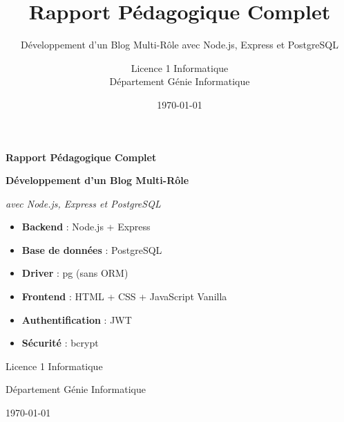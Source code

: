 \documentclass[a4paper,12pt]{book}
\title{\textbf{\Huge Rapport Pédagogique Complet}}
\subtitle{\Large Développement d'un Blog Multi-Rôle avec Node.js, Express et PostgreSQL}
\author{Licence 1 Informatique\\Département Génie Informatique}
\date{\today}
\begin{document}
\begin{titlepage}
    \centering
    \vspace*{2cm}
    {\Huge\bfseries\color{deepblue} Rapport Pédagogique Complet\par}
    \vspace{1cm}
    {\Large\bfseries\color{darkblue} Développement d'un Blog Multi-Rôle\par}
    \vspace{0.5cm}
    {\large\itshape avec Node.js, Express et PostgreSQL\par}
    \vspace{2cm}
    
    \begin{tcolorbox}[colback=white,colframe=deepblue,width=0.8\textwidth,center,title=Stack Technologique]
        \begin{itemize}
            \item \textbf{Backend} : Node.js + Express
            \item \textbf{Base de données} : PostgreSQL
            \item \textbf{Driver} : pg (sans ORM)
            \item \textbf{Frontend} : HTML + CSS + JavaScript Vanilla
            \item \textbf{Authentification} : JWT
            \item \textbf{Sécurité} : bcrypt
        \end{itemize}
    \end{tcolorbox}
    
    \vspace{2cm}
    {\large Licence 1 Informatique\par}
    {\large Département Génie Informatique\par}
    \vspace{1cm}
    {\large \today\par}
\end{titlepage}

\tableofcontents
\newpage

\end{document}
